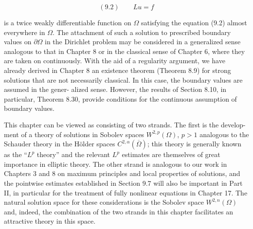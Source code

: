 \[
(9.2)\qquad Lu = f
\]

is a twice weakly differentiable function on $\Omega$ satisfying the equation (9.2) almost
everywhere in $\Omega$. The attachment of such a solution to prescribed boundary values
on $\partial\Omega$ in the Dirichlet problem may be considered in a generalized sense analogous
to that in Chapter 8 or in the classical sense of Chapter 6, where they are taken on
continuously. With the aid of a regularity argument, we have already derived in
Chapter 8 an existence theorem (Theorem 8.9) for strong solutions that are not
necessarily classical. In this case, the boundary values are assumed in the gener-
alized sense. However, the results of Section 8.10, in particular, Theorem 8.30,
provide conditions for the continuous assumption of boundary values.

    This chapter can be viewed as consisting of two strands. The first is the develop-
ment of a theory of solutions in Sobolev spaces $W^{2,p}(\Omega)$, $p > 1$ analogous to the
Schauder theory in the H\"older spaces $C^{2,\alpha}(\overline{\Omega})$; this theory is generally known as the
``$L^p$ theory'' and the relevant $L^p$ estimates are themselves of great importance in
elliptic theory. The other strand is analogous to our work in Chapters 3 and 8 on
maximum principles and local properties of solutions, and the pointwise estimates
established in Section 9.7 will also be important in Part II, in particular for the
treatment of fully nonlinear equations in Chapter 17. The natural solution space for
these considerations is the Sobolev space $W^{2,n}(\Omega)$ and, indeed, the combination of
the two strands in this chapter facilitates an attractive theory in this space.
